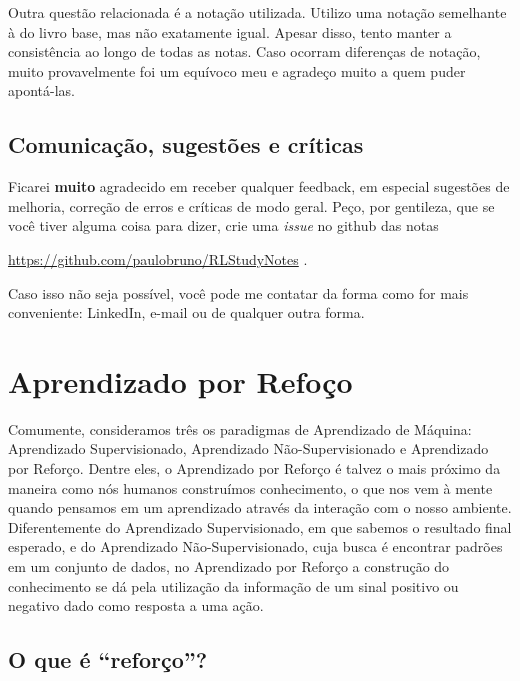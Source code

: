\documentclass{article}
\begin{document}
            Outra questão relacionada é a notação utilizada.
            Utilizo uma notação semelhante à do livro base, mas não exatamente igual.
            Apesar disso, tento manter a consistência ao longo de todas as notas.
            Caso ocorram diferenças de notação, muito provavelmente foi um equívoco meu e agradeço muito a quem puder apontá-las.
            
        \subsection{Comunicação, sugestões e críticas}
            
            Ficarei \textbf{muito} agradecido em receber qualquer feedback, em especial sugestões de melhoria, correção de erros e críticas de modo geral.
            Peço, por gentileza, que se você tiver alguma coisa para dizer, crie uma \emph{issue} no github das notas
            
            \begin{center}
                \url{https://github.com/paulobruno/RLStudyNotes} .
            \end{center}
            Caso isso não seja possível, você pode me contatar da forma como for mais conveniente: LinkedIn, e-mail ou de qualquer outra forma.
            
            
    \section{Aprendizado por Refoço}
    
        Comumente, consideramos três os paradigmas de Aprendizado de Máquina: Aprendizado Supervisionado, Aprendizado Não-Supervisionado e Aprendizado por Reforço.
        Dentre eles, o Aprendizado por Reforço é talvez o mais próximo da maneira como nós humanos construímos conhecimento, o que nos vem à mente quando pensamos em um aprendizado através da interação com o nosso ambiente.
        Diferentemente do Aprendizado Supervisionado, em que sabemos o resultado final esperado, e do Aprendizado Não-Supervisionado, cuja busca é encontrar padrões em um conjunto de dados, no Aprendizado por Reforço a construção do conhecimento se dá pela utilização da informação de um sinal positivo ou negativo dado como resposta a uma ação. 
        
        \subsection{O que é ``reforço''?}
        
\end{document}

